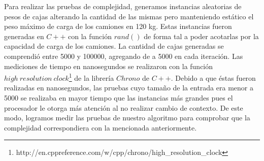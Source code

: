 Para realizar las pruebas de complejidad, generamos instancias aleatorias de pesos de cajas alterando la cantidad de las mismas pero manteniendo estático el peso máximo de carga de los camiones en 120 \unit{kg}. Estas instancias fueron generadas en $C++$ con la función $rand()$ de forma tal a poder acotarlas por la capacidad de carga de los camiones. La cantidad de cajas generadas se comprendió entre 5000 y 100000, agregando de a 5000 en cada iteración. Las mediciones de tiempo en nanosegundos se realizaron con la función $high\ resolution\ clock$\footnote{http://en.cppreference.com/w/cpp/chrono/high\_resolution\_clock} de la librería $Chrono$ de $C++$. Debido a que éstas fueron realizadas en nanosegundos, las pruebas cuyo tamaño de la entrada era menor a 5000 se realizaba en mayor tiempo que las instancias más grandes pues el procesador le otorga más atención al no realizar cambio de contexto. De este modo, logramos medir las pruebas de nuestro algoritmo para comprobar que la complejidad correspondiera con la mencionada anteriormente.

